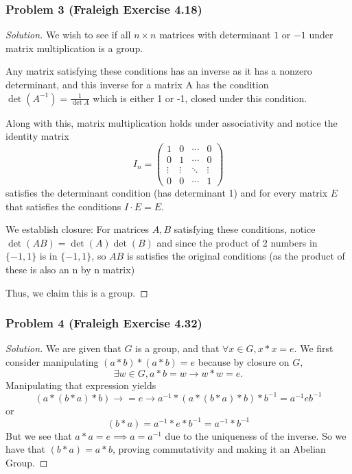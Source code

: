\documentclass[11pt]{article}
\newcommand{\1}{\mathbf{1}}
\theoremstyle{definition}
\newenvironment{solution}{\begin{proof}[Solution]}{\end{proof}}
\begin{document}
\subsubsection*{Problem 3 (Fraleigh Exercise 4.18)}
\begin{solution}
    We wish to see if all $n\times n$ matrices with determinant $1$ or $-1$ under
    matrix multiplication is a group.
    \par Any matrix satisfying these conditions has an inverse as it  has a nonzero
    determinant, and this inverse for a matrix A has the condition $\det(A^{-1} ) =
    \frac{1}{\det A}$ which is either 1 or -1, closed under this condition.
    \par Along with this, matrix multiplication holds under associativity and notice the
    identity matrix \[
I_n =
\begin{pmatrix}
1 & 0 & \cdots & 0 \\
0 & 1 & \cdots & 0 \\
\vdots & \vdots & \ddots & \vdots \\
0 & 0 & \cdots & 1
\end{pmatrix}
\]
satisfies the determinant condition (has determinant 1) and for every matrix $E$ that
satisfies the conditions $I \cdot E = E$.
\par We establish closure: For matrices $A, B$ satisfying these conditions, notice
$\det(AB) = \det(A)\det(B)$ and since the product of 2 numbers in $\{-1, 1\}$ is in
$\{-1, 1\}$, so $AB$ is satisfies the original conditions (as the product of these is
also an n by n matrix)
\par Thus, we claim this is a group.
\end{solution}
\subsubsection*{Problem 4 (Fraleigh Exercise 4.32)}
\begin{solution}
We are given that $G$ is a group, and that $\forall x \in G, x * x  = e.$ We first
consider manipulating $(a * b) * (a * b) = e$ because by closure on $G,$ $$\exists w \in
G, a * b = w \rightarrow w * w = e.$$
Manipulating that expression  yields $$(a * (b * a) * b) \rightarrow = e \rightarrow
a^{-1} * (a * (b * a) * b) * b^{-1 }= a^{-1} eb^{-1}$$
or 
$$(b * a) = a^{-1} * e *  b^{-1} = a^{-1} * b^{-1}$$
But we see that $a * a = e\implies a = a^{-1}$ due to the uniqueness of the inverse.
So we have that $(b * a) = a * b$, proving commutativity and making it an Abelian Group.
\end{solution}
\end{document}
